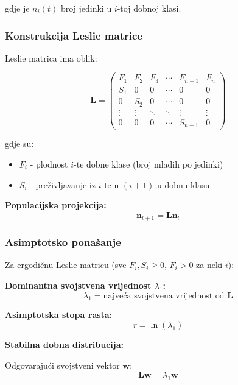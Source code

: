 \documentclass[11pt,oneside]{book}
\begin{document}
gdje je $n_i(t)$ broj jedinki u $i$-toj dobnoj klasi.

\subsubsection{Konstrukcija Leslie matrice}

Leslie matrica ima oblik:

\begin{equation}
	\mathbf{L} = \begin{pmatrix}
		F_1 & F_2 & F_3 & \cdots & F_{n-1} & F_n \\
		S_1 & 0 & 0 & \cdots & 0 & 0 \\
		0 & S_2 & 0 & \cdots & 0 & 0 \\
		\vdots & \vdots & \ddots & \ddots & \vdots & \vdots \\
		0 & 0 & 0 & \cdots & S_{n-1} & 0
	\end{pmatrix}
\end{equation}

gdje su:
\begin{itemize}
	\item $F_i$ - plodnost $i$-te dobne klase (broj mladih po jedinki)
	\item $S_i$ - preživljavanje iz $i$-te u $(i+1)$-u dobnu klasu
\end{itemize}

\textbf{Populacijska projekcija:}
\begin{equation}
	\mathbf{n}_{t+1} = \mathbf{L} \mathbf{n}_t
\end{equation}

\subsubsection{Asimptotsko ponašanje}

Za ergodičnu Leslie matricu (sve $F_i, S_i \geq 0$, $F_i > 0$ za neki $i$):

\textbf{Dominantna svojstvena vrijednost $\lambda_1$:}
\begin{equation}
	\lambda_1 = \text{najveća svojstvena vrijednost od } \mathbf{L}
\end{equation}

\textbf{Asimptotska stopa rasta:}
\begin{equation}
	r = \ln(\lambda_1)
\end{equation}

\textbf{Stabilna dobna distribucija:}

Odgovarajući svojstveni vektor $\mathbf{w}$:
\begin{equation}
	\mathbf{L} \mathbf{w} = \lambda_1 \mathbf{w}
\end{equation}
\end{document}
